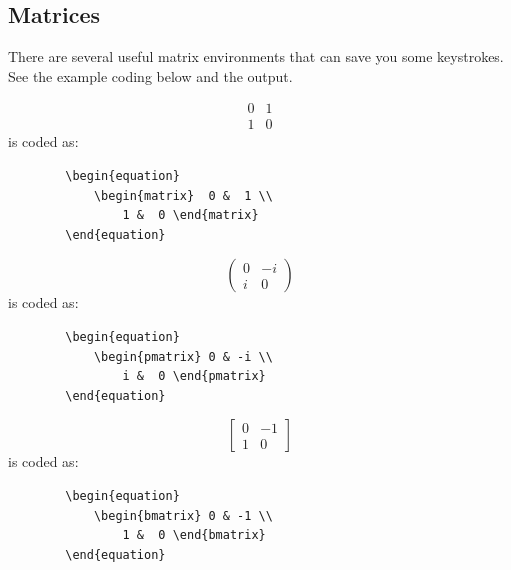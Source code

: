 \documentclass[lettersize,journal]{IEEEtran}
\begin{document}
	\subsection{Matrices}
	There are several useful matrix environments that can save you some keystrokes. See the example coding below and the output.
	
	\begin{equation}
		\begin{matrix}  0 &  1 \\ 
			1 &  0 \end{matrix}
	\end{equation}
	is coded as:
	\begin{verbatim}
		\begin{equation}
			\begin{matrix}  0 &  1 \\ 
				1 &  0 \end{matrix}
		\end{equation}
	\end{verbatim}
	
	\begin{equation}
		\begin{pmatrix} 0 & -i \\
			i &  0 \end{pmatrix}
	\end{equation}
	is coded as:
	\begin{verbatim}
		\begin{equation}
			\begin{pmatrix} 0 & -i \\
				i &  0 \end{pmatrix}
		\end{equation}
	\end{verbatim}
	
	\begin{equation}
		\begin{bmatrix} 0 & -1 \\ 
			1 &  0 \end{bmatrix}
	\end{equation}
	is coded as:
	\begin{verbatim}
		\begin{equation}
			\begin{bmatrix} 0 & -1 \\ 
				1 &  0 \end{bmatrix}
		\end{equation}
	\end{verbatim}
	
\end{document}
